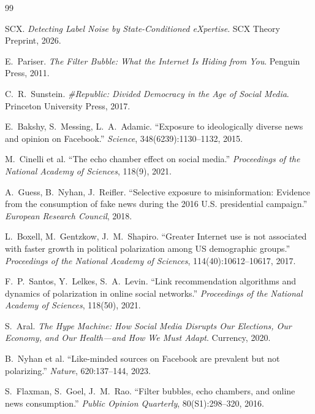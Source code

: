 \documentclass[11pt,a4paper]{article}
\theoremstyle{remark}
\begin{document}
\begin{thebibliography}{99}

SCX. \emph{Detecting Label Noise by State-Conditioned eXpertise}. SCX Theory Preprint, 2026.

E.~Pariser. \emph{The Filter Bubble: What the Internet Is Hiding from You}. Penguin Press, 2011.

C.~R.~Sunstein. \emph{\#Republic: Divided Democracy in the Age of Social Media}. Princeton University Press, 2017.

E.~Bakshy, S.~Messing, L.~A.~Adamic. ``Exposure to ideologically diverse news and opinion on Facebook.''
\emph{Science}, 348(6239):1130--1132, 2015.

M.~Cinelli et al. ``The echo chamber effect on social media.''
\emph{Proceedings of the National Academy of Sciences}, 118(9), 2021.

A.~Guess, B.~Nyhan, J.~Reifler. ``Selective exposure to misinformation: Evidence from the consumption of fake news during the 2016 U.S. presidential campaign.''
\emph{European Research Council}, 2018.

L.~Boxell, M.~Gentzkow, J.~M.~Shapiro. ``Greater Internet use is not associated with faster growth in political polarization among US demographic groups.''
\emph{Proceedings of the National Academy of Sciences}, 114(40):10612--10617, 2017.

F.~P.~Santos, Y.~Lelkes, S.~A.~Levin. ``Link recommendation algorithms and dynamics of polarization in online social networks.''
\emph{Proceedings of the National Academy of Sciences}, 118(50), 2021.

S.~Aral. \emph{The Hype Machine: How Social Media Disrupts Our Elections, Our Economy, and Our Health---and How We Must Adapt}. Currency, 2020.

B.~Nyhan et al. ``Like-minded sources on Facebook are prevalent but not polarizing.''
\emph{Nature}, 620:137--144, 2023.

S.~Flaxman, S.~Goel, J.~M.~Rao. ``Filter bubbles, echo chambers, and online news consumption.''
\emph{Public Opinion Quarterly}, 80(S1):298--320, 2016.


\end{thebibliography}
\end{document}
